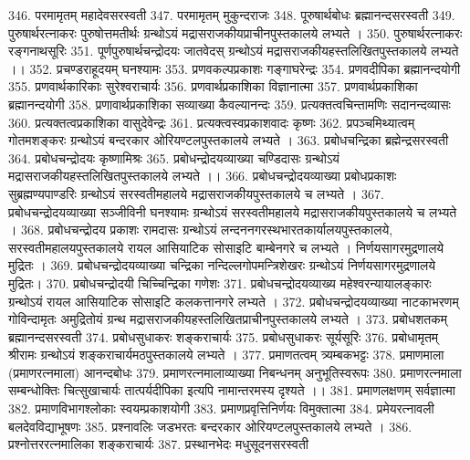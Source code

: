 346. परमामृतम् 						महादेवसरस्वती
347. परमामृतम् 						मुकुन्दराजः
348. पूरुषार्थबोधः 						ब्रह्मानन्दसरस्वती
349. पुरुषार्थरत्नाकरः					पुरुषोत्तमतीर्थः
		ग्रन्थोऽयं मद्रासराजकीयप्राचीनपुस्तकालये लभ्यते । 
350. पुरुषार्थरत्नाकरः					रङ्गनाथसूरिः	
351.	पूर्णपुरुषार्थचन्द्रोदयः				जातवेदस्
		ग्रन्थोऽयं मद्रासराजकीयहस्तलिखितपुस्तकालये लभ्यते ।। 
352. प्रचण्डराहूदयम् 					घनश्यामः
353. प्रणवकल्पप्रकाशः					गङ्गाघरेन्द्रः
354. प्रणवदीपिका						ब्रह्मानन्दयोगी
355. प्रणवार्थकारिकाः					सुरेश्वराचार्यः
356. प्रणवार्थप्रकाशिका 				विज्ञानात्मा
357. प्रणवार्थप्रकाशिका					ब्रह्मानन्दयोगी
358. प्रणावार्थप्रकाशिका सव्याख्या 	कैवल्यानन्दः 
359. प्रत्यक्तत्वचिन्तामणिः				सदानन्दव्यासः
360. प्रत्यक्तत्वप्रकाशिका				वासुदेवेन्द्रः
361. प्रत्यक्त्वस्वप्रकाशवादः			कृष्णः
362. प्रपञ्चमिथ्यात्वम् 					गोतमशङ्करः
		ग्रन्थोऽयं बन्दरकार ओरियण्टलपुस्तकालये लभ्यते । 
363. प्रबोधचन्द्रिका						ब्रह्मेन्द्रसरस्वती
364. प्रबोधचन्द्रोदयः 					कृष्णामिश्रः
365. प्रबोधन्द्रोदयव्याख्या				चण्डिदासः
		ग्रन्थोऽयं मद्रासराजकीयहस्तलिखितपुस्तकालये लभ्यते ।। 
366. प्रबोधचन्द्रोदयव्याख्या प्रबोधप्रकाशः सुब्रह्मण्यपाण्डरिः
		ग्रन्थोऽयं सरस्वतीमहालये मद्रासराजकीयपुस्तकालये च लभ्यते । 
367. प्रबोधचन्द्रोदयव्याख्या सञ्जीविनी	घनश्यामः
		ग्रन्थोऽयं सरस्वतीमहालये मद्रासराजकीयपुस्तकालये च लभ्यते । 
368. प्रबोधचन्द्रोदय प्रकाशः			रामदासः
		ग्रन्थोऽयं लन्दननगरस्थभारतकार्यालयपुस्तकालये, सरस्वतीमहालयपुस्तकालये रायल आसियाटिक सोसाइटि बाम्बेनगरे च लभ्यते । निर्णयसागरमुद्रणालये मुद्रितः । 
369. प्रबोधचन्द्रोदयव्याख्या चन्द्रिका 	नन्दिल्लगोपमन्त्रिशेखरः
		ग्रन्थोऽयं निर्णयसागरमुद्रणालये मुद्रितः।
370. प्रबोधचन्द्रोदयी चिच्चिन्द्रिका 	गणेशः 
371. प्रबोधचन्द्रोदयव्याख्य 				महेश्वरन्यायालङ्कारः
		ग्रन्थोऽयं रायल आसियाटिक सोसाइटि कलकत्तानगरे लभ्यते ।
372. प्रबोधचन्द्रोदयव्याख्या नाटकाभरणम्  गोविन्दामृतः
		अमुद्रितोयं ग्रन्थ मद्रासराजकीयहस्तलिखितप्राचीनपुस्तकालये लभ्यते । 
373. प्रबोधशतकम् 						ब्रह्मानन्दसरस्वती
374. प्रबोधसुधाकरः					शङ्कराचार्यः
375. प्रबोधसुधाकरः					सूर्यसूरिः
376. प्रबोधामृतम् 						श्रीरामः
		ग्रन्थोऽयं शङ्कराचार्यमठपुस्तकालये लभ्यते ।
377.	प्रमाणतत्वम् 						त्र्यम्बकभट्टः
378. प्रमाणमाला (प्रमाणरत्नमाला)	आनन्दबोधः
379. प्रमाणरत्नमालाव्याख्या निबन्धनम् 	अनुभूतिस्वरूपः
380. प्रमाणरत्नमाला सम्बन्धोक्तिः		चित्सुखाचार्यः
		तात्पर्यदीपिका इत्यपि नामान्तरमस्य दृश्यते ।। 
381. प्रमाणलक्षणम् 						सर्वज्ञात्मा
382. प्रमाणविभागश्लोकाः				स्वयम्प्रकाशयोगी
383. प्रमाणप्रवृत्तिनिर्णयः				विमुक्तात्मा 				
384. प्रमेयरत्नावली 					बलदेवविद्याभूषणः
385. प्रश्नावलिः							जडभरतः
		बन्दरकार ओरियण्टलपुस्तकालये लभ्यते । 
386. प्रश्नोत्तररत्नमालिका 				शङ्कराचार्यः
387. प्रस्थानभेदः						मधुसूदनसरस्वती
